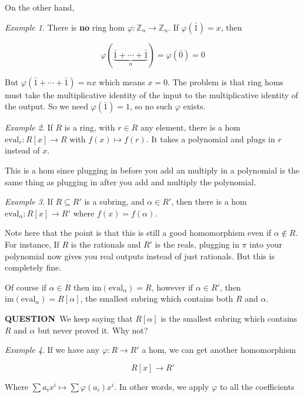 \documentclass[12pt]{article}
\def\im{\text{im}}
\def\Z{{\mathbb Z}}
\def\QUESTION{\color{red}\textbf{QUESTION}\color{black}\,}
\theoremstyle{remark}
\theoremstyle{remark}
\theoremstyle{remark}
\newtheorem{example}{Example}
\theoremstyle{remark}
\theoremstyle{remark}
\begin{document}
On the other hand, 

\begin{example}
  There is {\bf no} ring hom $\varphi: \Z_n \to \Z_n$. If
  $\varphi(\bar 1) = x$, then 

  \[
    \varphi(\underbrace{\bar 1 + \cdots + \bar 1}_{n}) = \varphi(\bar 0) = 0
  \]

  But $\varphi(\bar 1 + \cdots + \bar 1) = nx$ which means $x = 0$. The problem is
  that ring homs must take the multiplicative identity of the input to the
  multiplicative identity of the output. So we need $\varphi(\bar 1) = 1$, so no
  such $\varphi$ exists.
\end{example}

\begin{example}
  If $R$ is a ring, with $r \in R$ any element, there is a hom $\text{eval}_r:
  R[x] \to R$ with $f(x) \mapsto f(r)$. It takes a polynomial and plugs in $r$
  instead of $x$.

  This is a hom since plugging in before you add an multiply in a polynomial is
  the same thing as plugging in after you add and multiply the polynomial.
\end{example}

\begin{example}
  If $R \subseteq R'$ is a subring, and $\alpha \in R'$, then there is a hom
  $\text{eval}_\alpha: R[x] \to R'$ where $f(x) = f(\alpha)$.

  Note here that the point is that this is still a good homomorphism even if
  $\alpha \not\in R$. For instance, If $R$ is the rationals and $R'$ is the
  reals, plugging in $\pi$ into your polynomial now gives you real outputs
  instead of just rationals. But this is completely fine.

  Of course if $\alpha \in R$ then $\im(\text{eval}_\alpha) = R$, however if
  $\alpha \in R'$, then $\im(\text{eval}_\alpha) = R[\alpha]$, the smallest
  subring which contains both $R$ and $\alpha$.

  \QUESTION{} We keep saying that $R[\alpha]$ is the smallest subring which
  contains $R$ and $\alpha$ but never proved it. Why not?
\end{example}

\begin{example}
  If we have any $\varphi: R \to R'$ a hom, we can get another homomorphism

  \[
    R[x] \to R'
  \]

  Where $\sum a_i x^i \mapsto \sum \varphi(a_i) x^i$. In other words, we apply
  $\varphi$ to all the coefficients
\end{example}
\end{document}
